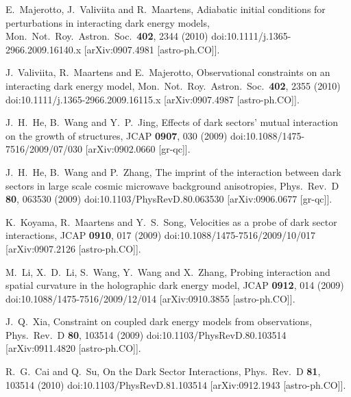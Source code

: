 \documentclass[aps,prd,nofootinbib,amsmath,amssymb,superscriptaddress,twocolumn,10pt]{revtex4}%
\begin{document}
\begin{thebibliography}{99}
  E.~Majerotto, J.~Valiviita and R.~Maartens,
  Adiabatic initial conditions for perturbations in interacting dark energy models,
  Mon.\ Not.\ Roy.\ Astron.\ Soc.\  {\bf 402}, 2344 (2010)
  doi:10.1111/j.1365-2966.2009.16140.x
  [arXiv:0907.4981 [astro-ph.CO]].

  J.~Valiviita, R.~Maartens and E.~Majerotto,
  Observational constraints on an interacting dark energy model,
  Mon.\ Not.\ Roy.\ Astron.\ Soc.\  {\bf 402}, 2355 (2010)
  doi:10.1111/j.1365-2966.2009.16115.x
  [arXiv:0907.4987 [astro-ph.CO]].

  J.~H.~He, B.~Wang and Y.~P.~Jing,
  Effects of dark sectors' mutual interaction on the growth of structures,
  JCAP {\bf 0907}, 030 (2009)
  doi:10.1088/1475-7516/2009/07/030
  [arXiv:0902.0660 [gr-qc]].


  J.~H.~He, B.~Wang and P.~Zhang,
  The imprint of the interaction between dark sectors in large scale cosmic microwave background anisotropies,
  Phys.\ Rev.\ D {\bf 80}, 063530 (2009)
  doi:10.1103/PhysRevD.80.063530
  [arXiv:0906.0677 [gr-qc]].

  K.~Koyama, R.~Maartens and Y.~S.~Song,
  Velocities as a probe of dark sector interactions,
  JCAP {\bf 0910}, 017 (2009)
  doi:10.1088/1475-7516/2009/10/017
  [arXiv:0907.2126 [astro-ph.CO]].


  M.~Li, X.~D.~Li, S.~Wang, Y.~Wang and X.~Zhang,
  Probing interaction and spatial curvature in the holographic dark energy model,
  JCAP {\bf 0912}, 014 (2009)
  doi:10.1088/1475-7516/2009/12/014
  [arXiv:0910.3855 [astro-ph.CO]].


  J.~Q.~Xia,
  Constraint on coupled dark energy models from observations,
  Phys.\ Rev.\ D {\bf 80}, 103514 (2009)
  doi:10.1103/PhysRevD.80.103514
  [arXiv:0911.4820 [astro-ph.CO]].

  R.~G.~Cai and Q.~Su,
  On the Dark Sector Interactions,
  Phys.\ Rev.\ D {\bf 81}, 103514 (2010)
  doi:10.1103/PhysRevD.81.103514
  [arXiv:0912.1943 [astro-ph.CO]].


\end{thebibliography}
\end{document}
